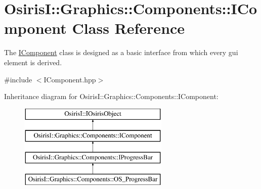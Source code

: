 \hypertarget{class_osiris_i_1_1_graphics_1_1_components_1_1_i_component}{\section{Osiris\-I\-:\-:Graphics\-:\-:Components\-:\-:I\-Component Class Reference}
\label{class_osiris_i_1_1_graphics_1_1_components_1_1_i_component}
}


The \hyperlink{class_osiris_i_1_1_graphics_1_1_components_1_1_i_component}{I\-Component} class is designed as a basic interface from which every gui element is derived.  




{\ttfamily \#include $<$I\-Component.\-hpp$>$}

Inheritance diagram for Osiris\-I\-:\-:Graphics\-:\-:Components\-:\-:I\-Component\-:\begin{figure}[H]
\begin{center}
\leavevmode
\includegraphics[height=4.000000cm]{class_osiris_i_1_1_graphics_1_1_components_1_1_i_component}
\end{center}
\end{figure}
